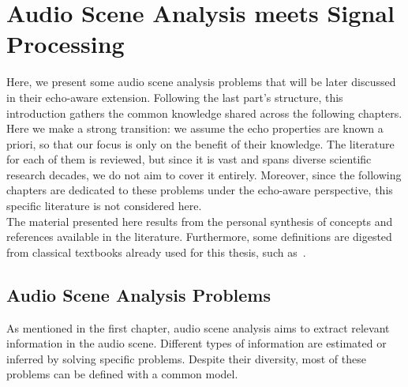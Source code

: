 \chapter{Audio Scene Analysis meets Signal Processing}\label{ch:application}

 \synopsisChApplication

\mynewline
Here, we present some audio scene analysis problems that will be later discussed in their echo-aware extension.
Following the last part's structure, this introduction gathers the common knowledge shared across the following chapters.
Here we make a strong transition: we assume the echo properties are known a priori, so that our focus is only on the benefit of their knowledge.
The literature for each of them is reviewed, but since it is vast and spans diverse scientific research decades, we do not aim to cover it entirely.
Moreover, since the following chapters are dedicated to these problems under the echo-aware perspective, this specific literature is not considered here.
\\The material presented here results from the personal synthesis of concepts and references available in the literature.
Furthermore, some definitions are digested from classical textbooks already used for this thesis, such as~.

\section{Audio Scene Analysis Problems}\label{sec:application:scenario}
As mentioned in the first chapter, audio scene analysis aims to extract relevant information in the audio scene.
Different types of information are estimated or inferred by solving specific problems.
Despite their diversity, most of these problems can be defined with a common model.

